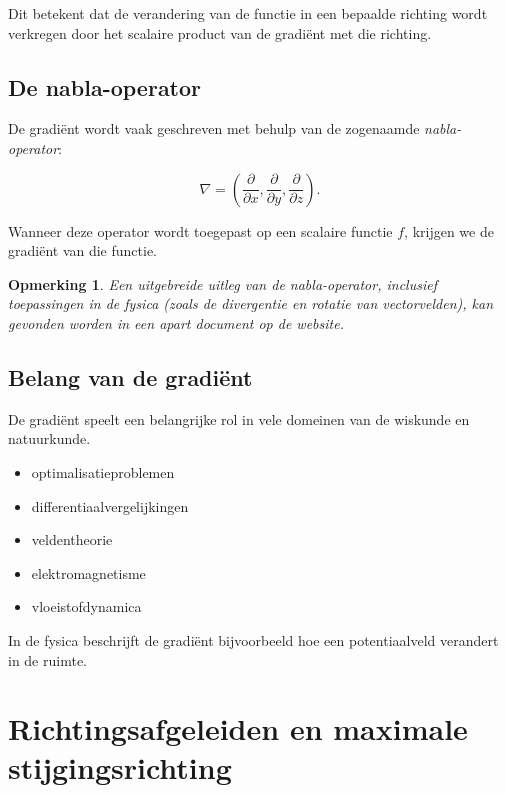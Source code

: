\documentclass[11pt,a4paper]{article}
\newtheorem{remark}[theorem]{Opmerking}
\begin{document}
    Dit betekent dat de verandering van de functie in een bepaalde richting wordt
    verkregen door het scalaire product van de gradiënt met die richting.

    \subsection{De nabla-operator}

    De gradiënt wordt vaak geschreven met behulp van de zogenaamde
    \textit{nabla-operator}:

    \[
        \nabla =
        \left(
            \frac{\partial}{\partial x},
            \frac{\partial}{\partial y},
            \frac{\partial}{\partial z}
        \right).
    \]

    Wanneer deze operator wordt toegepast op een scalaire functie $f$, krijgen we
    de gradiënt van die functie.

    \begin{remark}
        Een uitgebreide uitleg van de nabla-operator, inclusief toepassingen in de
        fysica (zoals de divergentie en rotatie van vectorvelden), kan gevonden worden
        in een apart document op de website.
    \end{remark}

    \subsection{Belang van de gradiënt}

    De gradiënt speelt een belangrijke rol in vele domeinen van de wiskunde en
    natuurkunde.

    \begin{itemize}
        \item optimalisatieproblemen
        \item differentiaalvergelijkingen
        \item veldentheorie
        \item elektromagnetisme
        \item vloeistofdynamica
    \end{itemize}

    In de fysica beschrijft de gradiënt bijvoorbeeld hoe een potentiaalveld
    verandert in de ruimte.


    \section{Richtingsafgeleiden en maximale stijgingsrichting}
\end{document}

